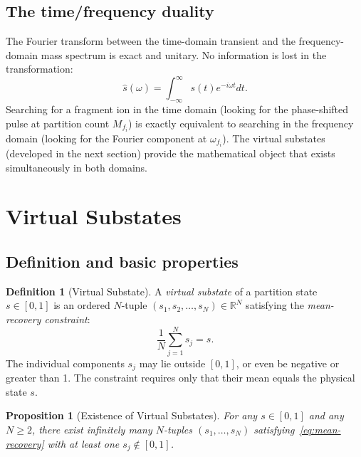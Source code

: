 \documentclass[twocolumn,10pt,a4paper]{article}
\theoremstyle{thmstyle}
\newtheorem{proposition}[theorem]{Proposition}
\theoremstyle{definition}
\newtheorem{definition}[theorem]{Definition}
\theoremstyle{remark}
\newcommand{\R}{\mathbb{R}}
\begin{document}
\subsection{The time/frequency duality}

The Fourier transform between the time-domain transient and the
frequency-domain mass spectrum is exact and unitary. No information
is lost in the transformation:
\begin{equation}
\hat{s}(\omega) = \int_{-\infty}^{\infty} s(t) e^{-i\omega t} dt.
\label{eq:fourier}
\end{equation}
Searching for a fragment ion in the time domain (looking for the
phase-shifted pulse at partition count $M_{f_i}$) is exactly equivalent
to searching in the frequency domain (looking for the Fourier component
at $\omega_{f_i}$). The virtual substates (developed in the next section)
provide the mathematical object that exists simultaneously in both
domains.

\section{Virtual Substates}
\label{sec:virtual}

\subsection{Definition and basic properties}

\begin{definition}[Virtual Substate]
\label{def:virtual}
A \emph{virtual substate} of a partition state $s \in [0,1]$ is an
ordered $N$-tuple $(s_1, s_2, \ldots, s_N) \in \R^N$ satisfying the
\emph{mean-recovery constraint}:
\begin{equation}
\frac{1}{N}\sum_{j=1}^{N} s_j = s.
\label{eq:mean-recovery}
\end{equation}
The individual components $s_j$ may lie outside $[0,1]$, or even be
negative or greater than 1. The constraint requires only that their
mean equals the physical state $s$.
\end{definition}

\begin{proposition}[Existence of Virtual Substates]
For any $s \in [0,1]$ and any $N \geq 2$, there exist infinitely many
$N$-tuples $(s_1,\ldots,s_N)$ satisfying~\eqref{eq:mean-recovery}
with at least one $s_j \notin [0,1]$.
\end{proposition}
\end{document}
